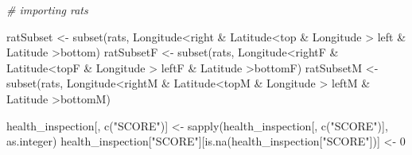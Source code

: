 \documentclass[
]{article}
\newenvironment{Shaded}{\begin{snugshade}}{\end{snugshade}}
\newcommand{\CommentTok}[1]{\textcolor[rgb]{0.56,0.35,0.01}{\textit{#1}}}
\newcommand{\DecValTok}[1]{\textcolor[rgb]{0.00,0.00,0.81}{#1}}
\newcommand{\FunctionTok}[1]{\textcolor[rgb]{0.00,0.00,0.00}{#1}}
\newcommand{\NormalTok}[1]{#1}
\newcommand{\OtherTok}[1]{\textcolor[rgb]{0.56,0.35,0.01}{#1}}
\newcommand{\SpecialCharTok}[1]{\textcolor[rgb]{0.00,0.00,0.00}{#1}}
\newcommand{\StringTok}[1]{\textcolor[rgb]{0.31,0.60,0.02}{#1}}
\begin{document}
\begin{Shaded}
\begin{Highlighting}[]
\CommentTok{\# importing rats}

\NormalTok{ratSubset }\OtherTok{\textless{}{-}} \FunctionTok{subset}\NormalTok{(rats, Longitude}\SpecialCharTok{\textless{}}\NormalTok{right }\SpecialCharTok{\&}\NormalTok{ Latitude}\SpecialCharTok{\textless{}}\NormalTok{top }\SpecialCharTok{\&}\NormalTok{ Longitude }\SpecialCharTok{\textgreater{}}\NormalTok{ left }\SpecialCharTok{\&}\NormalTok{ Latitude }\SpecialCharTok{\textgreater{}}\NormalTok{bottom)}
\NormalTok{ratSubsetF }\OtherTok{\textless{}{-}} \FunctionTok{subset}\NormalTok{(rats, Longitude}\SpecialCharTok{\textless{}}\NormalTok{rightF }\SpecialCharTok{\&}\NormalTok{ Latitude}\SpecialCharTok{\textless{}}\NormalTok{topF }\SpecialCharTok{\&}\NormalTok{ Longitude }\SpecialCharTok{\textgreater{}}\NormalTok{ leftF }\SpecialCharTok{\&}\NormalTok{ Latitude }\SpecialCharTok{\textgreater{}}\NormalTok{bottomF)}
\NormalTok{ratSubsetM }\OtherTok{\textless{}{-}} \FunctionTok{subset}\NormalTok{(rats, Longitude}\SpecialCharTok{\textless{}}\NormalTok{rightM }\SpecialCharTok{\&}\NormalTok{ Latitude}\SpecialCharTok{\textless{}}\NormalTok{topM }\SpecialCharTok{\&}\NormalTok{ Longitude }\SpecialCharTok{\textgreater{}}\NormalTok{ leftM }\SpecialCharTok{\&}\NormalTok{ Latitude }\SpecialCharTok{\textgreater{}}\NormalTok{bottomM)}

\NormalTok{health\_inspection[, }\FunctionTok{c}\NormalTok{(}\StringTok{"SCORE"}\NormalTok{)] }\OtherTok{\textless{}{-}} \FunctionTok{sapply}\NormalTok{(health\_inspection[, }\FunctionTok{c}\NormalTok{(}\StringTok{"SCORE"}\NormalTok{)], as.integer)}
\NormalTok{health\_inspection[}\StringTok{"SCORE"}\NormalTok{][}\FunctionTok{is.na}\NormalTok{(health\_inspection[}\StringTok{"SCORE"}\NormalTok{])] }\OtherTok{\textless{}{-}} \DecValTok{0}


\end{Highlighting}
\end{Shaded}
\end{document}
